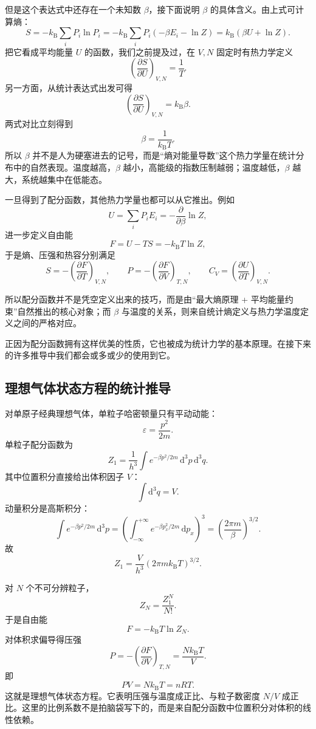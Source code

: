 \documentclass[UTF8]{ctexbook}
\begin{document}
但是这个表达式中还存在一个未知数 \(\beta\)，接下面说明 \(\beta\) 的具体含义。由上式可计算熵：
\[
S=-k_{\mathrm B}\sum_i P_i\ln P_i
=-k_{\mathrm B}\sum_i P_i(-\beta E_i-\ln Z)
=k_{\mathrm B}(\beta U+\ln Z).
\]
把它看成平均能量 \(U\) 的函数，我们之前提及过，在 \(V,N\) 固定时有热力学定义
\[
\left(\frac{\partial S}{\partial U}\right)_{V,N}=\frac{1}{T}.
\]
另一方面，从统计表达式出发可得
\[
\left(\frac{\partial S}{\partial U}\right)_{V,N}=k_{\mathrm B}\beta.
\]
两式对比立刻得到
\[
\beta=\frac{1}{k_{\mathrm B}T}.
\]
所以 \(\beta\) 并不是人为硬塞进去的记号，而是“熵对能量导数”这个热力学量在统计分布中的自然表现。温度越高，\(\beta\) 越小，高能级的指数压制越弱；温度越低，\(\beta\) 越大，系统越集中在低能态。

一旦得到了配分函数，其他热力学量也都可以从它推出。例如
\[
U=\sum_i P_iE_i=-\frac{\partial}{\partial \beta}\ln Z,
\]
进一步定义自由能
\[
F=U-TS=-k_{\mathrm B}T\ln Z,
\]
于是熵、压强和热容分别满足
\[
S=-\left(\frac{\partial F}{\partial T}\right)_{V,N},
\qquad
P=-\left(\frac{\partial F}{\partial V}\right)_{T,N},
\qquad
C_V=\left(\frac{\partial U}{\partial T}\right)_{V,N}.
\]

所以配分函数并不是凭空定义出来的技巧，而是由“最大熵原理 + 平均能量约束”自然推出的核心对象；而 \(\beta\) 与温度的关系，则来自统计熵定义与热力学温度定义之间的严格对应。

正因为配分函数拥有这样优美的性质，它也被成为统计力学的基本原理。在接下来的许多推导中我们都会或多或少的使用到它。

\subsection{理想气体状态方程的统计推导}

对单原子经典理想气体，单粒子哈密顿量只有平动动能：
\[
\varepsilon=\frac{p^2}{2m}.
\]
单粒子配分函数为
\[
Z_1=\frac{1}{h^3}\int e^{-\beta p^2/2m}\,\mathrm d^3p\,\mathrm d^3q.
\]
其中位置积分直接给出体积因子 \(V\)：
\[
\int \mathrm d^3q=V.
\]
动量积分是高斯积分：
\[
\int e^{-\beta p^2/2m}\,\mathrm d^3p=
\left(\int_{-\infty}^{+\infty}e^{-\beta p_x^2/2m}\,\mathrm dp_x\right)^3
=\left(\frac{2\pi m}{\beta}\right)^{3/2}.
\]
故
\[
Z_1=\frac{V}{h^3}(2\pi mk_{\mathrm B}T)^{3/2}.
\]

对 \(N\) 个不可分辨粒子，
\[
Z_N=\frac{Z_1^N}{N!}.
\]
于是自由能
\[
F=-k_{\mathrm B}T\ln Z_N.
\]
对体积求偏导得压强
\[
P=-\left(\frac{\partial F}{\partial V}\right)_{T,N}
=\frac{Nk_{\mathrm B}T}{V}.
\]
即
\[
PV=Nk_{\mathrm B}T=nRT.
\]
这就是理想气体状态方程。它表明压强与温度成正比、与粒子数密度 \(N/V\) 成正比。这里的比例系数不是拍脑袋写下的，而是来自配分函数中位置积分对体积的线性依赖。
\end{document}
